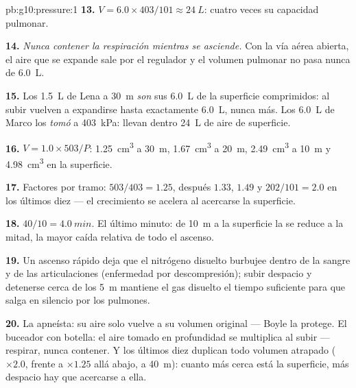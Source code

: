 \begin{solution}{pb:g10:pressure:1}
\textbf{13.} $V = 6.0 \times 403/101 \approx \qty{24}{L}$: cuatro veces
su capacidad pulmonar.

\textbf{14.} \emph{Nunca contener la respiración mientras se asciende.}
Con la vía aérea abierta, el aire que se expande sale por el regulador y
el volumen pulmonar no pasa nunca de \qty{6.0}{L}.

\textbf{15.} Los \qty{1.5}{L} de Lena a \qty{30}{m} \emph{son} sus
\qty{6.0}{L} de la superficie comprimidos: al subir vuelven a
expandirse hasta exactamente \qty{6.0}{L}, nunca más. Los \qty{6.0}{L}
de Marco los \emph{tomó} a \qty{403}{kPa}: llevan dentro \qty{24}{L} de
aire de superficie.

\textbf{16.} $V = 1.0 \times 503/P$: \qty{1.25}{cm^3} a \qty{30}{m},
\qty{1.67}{cm^3} a \qty{20}{m}, \qty{2.49}{cm^3} a \qty{10}{m} y
\qty{4.98}{cm^3} en la superficie.

\textbf{17.} Factores por tramo: $503/403 = 1.25$, después $1.33$,
$1.49$ y $202/101 = 2.0$ en los últimos diez  --- el crecimiento
se acelera al acercarse la superficie.

\textbf{18.} $40/10 = \qty{4.0}{min}$. El último minuto: de \qty{10}{m}
a la superficie la  se reduce a la mitad, la mayor caída
relativa de todo el ascenso.

\textbf{19.} Un ascenso rápido deja que el nitrógeno disuelto burbujee
dentro de la sangre y de las articulaciones (enfermedad por
descompresión); subir despacio y detenerse cerca de los \qty{5}{m}
mantiene el gas disuelto el tiempo suficiente para que salga en silencio
por los pulmones.

\textbf{20.} La apneísta: su aire solo vuelve a su volumen original ---
Boyle la protege. El buceador con botella: el aire tomado en
profundidad se multiplica al subir --- respirar, nunca contener. Y los
últimos diez  duplican todo volumen atrapado ($\times 2.0$, frente
a $\times 1.25$ allá abajo, a \qty{40}{m}): cuanto más cerca está la
superficie, más despacio hay que acercarse a ella.
\end{solution}
